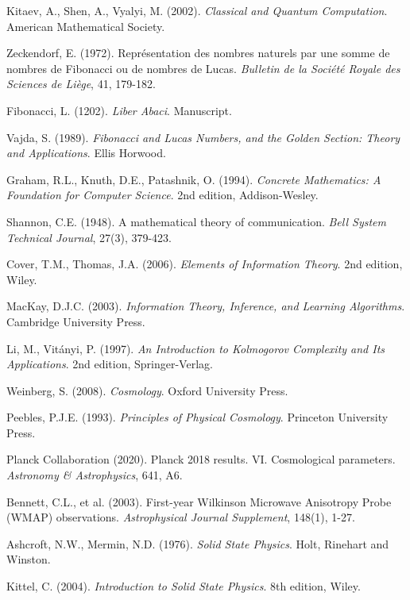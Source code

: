 \documentclass[12pt]{article}
\theoremstyle{plain}
\theoremstyle{definition}
\begin{document}
\begin{thebibliography}{99}
 Kitaev, A., Shen, A., Vyalyi, M. (2002). \emph{Classical and Quantum Computation}. American Mathematical Society.

 Zeckendorf, E. (1972). Représentation des nombres naturels par une somme de nombres de Fibonacci ou de nombres de Lucas. \emph{Bulletin de la Société Royale des Sciences de Liège}, 41, 179-182.

 Fibonacci, L. (1202). \emph{Liber Abaci}. Manuscript.

 Vajda, S. (1989). \emph{Fibonacci and Lucas Numbers, and the Golden Section: Theory and Applications}. Ellis Horwood.

 Graham, R.L., Knuth, D.E., Patashnik, O. (1994). \emph{Concrete Mathematics: A Foundation for Computer Science}. 2nd edition, Addison-Wesley.

 Shannon, C.E. (1948). A mathematical theory of communication. \emph{Bell System Technical Journal}, 27(3), 379-423.

 Cover, T.M., Thomas, J.A. (2006). \emph{Elements of Information Theory}. 2nd edition, Wiley.

 MacKay, D.J.C. (2003). \emph{Information Theory, Inference, and Learning Algorithms}. Cambridge University Press.

 Li, M., Vitányi, P. (1997). \emph{An Introduction to Kolmogorov Complexity and Its Applications}. 2nd edition, Springer-Verlag.

 Weinberg, S. (2008). \emph{Cosmology}. Oxford University Press.

 Peebles, P.J.E. (1993). \emph{Principles of Physical Cosmology}. Princeton University Press.

 Planck Collaboration (2020). Planck 2018 results. VI. Cosmological parameters. \emph{Astronomy \& Astrophysics}, 641, A6.

 Bennett, C.L., et al. (2003). First-year Wilkinson Microwave Anisotropy Probe (WMAP) observations. \emph{Astrophysical Journal Supplement}, 148(1), 1-27.

 Ashcroft, N.W., Mermin, N.D. (1976). \emph{Solid State Physics}. Holt, Rinehart and Winston.

 Kittel, C. (2004). \emph{Introduction to Solid State Physics}. 8th edition, Wiley.


\end{thebibliography}
\end{document}
